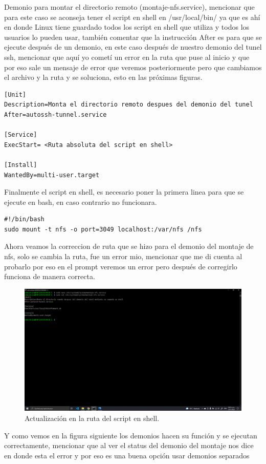 \documentclass[11pt]{article}
\begin{document}
		Demonio para montar el directorio remoto (montaje-nfs.service), mencionar que para este caso se aconseja tener el script en shell en /usr/local/bin/ ya que es ahí en donde Linux tiene guardado todos los script en shell que utiliza y todos los usuarios lo pueden usar, también comentar que la instrucción After es para que se ejecute después de un demonio, en este caso después de nuestro demonio del tunel ssh, mencionar que aquí yo cometí un error en la ruta que puse al inicio y que por eso sale un mensaje de error que veremos posteriormente pero que cambiamos el archivo y la ruta y se soluciona, esto en las próximas figuras.
		\begin{verbatim}
[Unit]
Description=Monta el directorio remoto despues del demonio del tunel
After=autossh-tunnel.service

[Service]
ExecStart= <Ruta absoluta del script en shell>

[Install]
WantedBy=multi-user.target
		\end{verbatim}
		Finalmente el script en shell, es necesario poner la primera linea para que se ejecute en bash, en caso contrario no funcionara.
		\begin{verbatim}
#!/bin/bash
sudo mount -t nfs -o port=3049 localhost:/var/nfs /nfs
		\end{verbatim}
		Ahora veamos la correccion de ruta que se hizo para el demonio del montaje de nfs, solo se cambia la ruta, fue un error mio, mencionar que me di cuenta al probarlo por eso en el prompt veremos un error pero después de corregirlo funciona de manera correcta.
		\begin{figure}[H]
			\centering
			\includegraphics[scale=0.34]{resources/demonioc1actu.png}
			\caption{Actualización en la ruta del script en shell.}\label{fig:picture}
		\end{figure}
		 Y como vemos en la figura siguiente los demonios hacen su función y se ejecutan correctamente, mencionar que al ver el status del demonio del montaje nos dice en donde esta el error y por eso es una buena opción usar demonios separados
\end{document}

